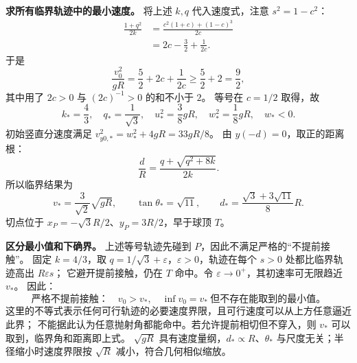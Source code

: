 \begin{xesolution}
\textbf{求所有临界轨迹中的最小速度。}
将上述 $k,q$ 代入速度式，注意 $s^2=1-c^2$：
\begin{align*}
 \frac{1+q^2}{2k}
 &=\frac{c^2(1+c)+(1-c)^3}{2c}\\
 &=2c-\frac32+\frac1{2c}.
\end{align*}
于是
\[
 \frac{v_0^2}{gR}
 =\frac52+2c+\frac1{2c}\ge\frac52+2=\frac92,
\]
其中用了 $2c>0$ 与 $(2c)^{-1}>0$ 的和不小于 $2$。
等号在 $c=1/2$ 取得，故
\[
 k_*=\frac43,\quad q_*=\frac1{\sqrt3},\quad
 u_*^2=\frac38gR,\quad w_*^2=\frac18gR,\quad w_*<0.
\]
初始竖直分速度满足 $v_{y0,*}^2=w_*^2+4gR=33gR/8$。
由 $y(-d)=0$，取正的距离根：
\[
 \frac{d}{R}=\frac{q+\sqrt{q^2+8k}}{2k}.
\]
所以临界结果为
\[
 \boxed{v_*=\frac3{\sqrt2}\sqrt{gR}},\qquad
 \boxed{\tan\theta_*=\sqrt{11}},\qquad
 \boxed{d_*=\frac{\sqrt3+3\sqrt{11}}8R}.
\]
切点位于 $x_P=-\sqrt3R/2$、$y_P=3R/2$，早于球顶 $T$。

\textbf{区分最小值和下确界。}
上述等号轨迹先碰到 $P$，因此不满足严格的“不提前接触”。
固定 $k=4/3$，取 $q=1/\sqrt3+\varepsilon$，$\varepsilon>0$，轨迹在每个 $s>0$ 处都比临界轨迹高出 $R\varepsilon s$；
它避开提前接触，仍在 $T$ 命中。令 $\varepsilon\to0^+$，其初速率可无限趋近 $v_*$。
因此：
\[
 \boxed{\text{严格不提前接触：}\quad v_0>v_*,
 \quad \inf v_0=v_*\ \text{但不存在能取到的最小值。}}
\]
这里的不等式表示任何可行轨迹的必要速度界限，且可行速度可以从上方任意逼近此界；
不能据此认为任意抛射角都能命中。若允许提前相切但不穿入，则 $v_*$ 可以取到，临界角和距离即上式。
$\sqrt{gR}$ 具有速度量纲，$d_*\propto R$、$\theta_*$ 与尺度无关；半径缩小时速度界限按 $\sqrt R$ 减小，符合几何相似缩放。
\end{xesolution}
